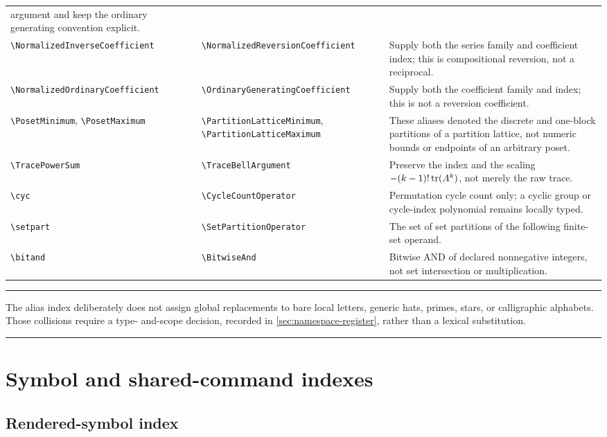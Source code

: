 \documentclass[11pt,oneside]{article}
\theoremstyle{definition}
\theoremstyle{remark}
\DeclareRobustCommand{\commandname}[1]{\texttt{\textbackslash#1}}
\newenvironment{boxedremark}{%
  \par\smallskip\noindent\begin{center}\begin{minipage}{0.94\textwidth}%
  \color{black}\hrule\vspace{0.6em}\small
}{%
  \vspace{0.6em}\hrule\end{minipage}\end{center}\smallskip
}
\begin{document}
\begin{longtable}{@{}p{}p{}p{}@{}}
argument and keep the ordinary generating convention explicit.\\
\commandname{NormalizedInverseCoefficient} &
\commandname{NormalizedReversionCoefficient} & Supply both the series family
and coefficient index; this is compositional reversion, not a reciprocal.\\
\commandname{NormalizedOrdinaryCoefficient} &
\commandname{OrdinaryGeneratingCoefficient} & Supply both the coefficient
family and index; this is not a reversion coefficient.\\
\commandname{PosetMinimum}, \commandname{PosetMaximum} &
\commandname{PartitionLatticeMinimum},
\commandname{PartitionLatticeMaximum} & These aliases denoted the discrete and
one-block partitions of a partition lattice, not numeric bounds or endpoints of
an arbitrary poset.\\
\commandname{TracePowerSum} & \commandname{TraceBellArgument} & Preserve the
index and the scaling \(-(k-1)!\operatorname{tr}(A^k)\), not merely the raw trace.\\
\commandname{cyc} & \commandname{CycleCountOperator} & Permutation cycle count
only; a cyclic group or cycle-index polynomial remains locally typed.\\
\commandname{setpart} & \commandname{SetPartitionOperator} & The set of set
partitions of the following finite-set operand.\\
\commandname{bitand} & \commandname{BitwiseAnd} & Bitwise AND of declared
nonnegative integers, not set intersection or multiplication.\\
\bottomrule
\end{longtable}
\endgroup

\begin{boxedremark}
The alias index deliberately does not assign global replacements to bare local letters,
generic hats, primes, stars, or calligraphic alphabets.  Those collisions require a type-
and-scope decision, recorded in \cref{sec:namespace-register}, rather than a lexical
substitution.
\end{boxedremark}

\section{Symbol and shared-command indexes}
\label{sec:symbol-index}

\subsection{Rendered-symbol index}
\end{document}
